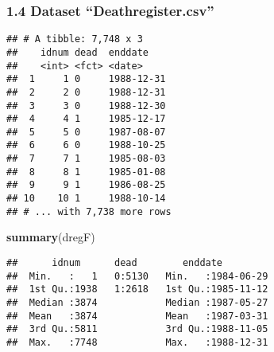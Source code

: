 \documentclass[]{article}
\newenvironment{Shaded}{\begin{snugshade}}{\end{snugshade}}
\newcommand{\DataTypeTok}[1]{\textcolor[rgb]{0.13,0.29,0.53}{#1}}
\newcommand{\KeywordTok}[1]{\textcolor[rgb]{0.13,0.29,0.53}{\textbf{#1}}}
\newcommand{\NormalTok}[1]{#1}
\newcommand{\OperatorTok}[1]{\textcolor[rgb]{0.81,0.36,0.00}{\textbf{#1}}}
\newcommand{\StringTok}[1]{\textcolor[rgb]{0.31,0.60,0.02}{#1}}
\begin{document}
\hypertarget{dataset-deathregister.csv}{%
\subsubsection{1.4 Dataset
``Deathregister.csv''}\label{dataset-deathregister.csv}}

\begin{Shaded}
\end{Shaded}

\begin{verbatim}
## # A tibble: 7,748 x 3
##    idnum dead  enddate   
##    <int> <fct> <date>    
##  1     1 0     1988-12-31
##  2     2 0     1988-12-31
##  3     3 0     1988-12-30
##  4     4 1     1985-12-17
##  5     5 0     1987-08-07
##  6     6 0     1988-10-25
##  7     7 1     1985-08-03
##  8     8 1     1985-01-08
##  9     9 1     1986-08-25
## 10    10 1     1988-10-14
## # ... with 7,738 more rows
\end{verbatim}

\begin{Shaded}
\begin{Highlighting}[]
\KeywordTok{summary}\NormalTok{(dregF)}
\end{Highlighting}
\end{Shaded}

\begin{verbatim}
##      idnum      dead        enddate          
##  Min.   :   1   0:5130   Min.   :1984-06-29  
##  1st Qu.:1938   1:2618   1st Qu.:1985-11-12  
##  Median :3874            Median :1987-05-27  
##  Mean   :3874            Mean   :1987-03-31  
##  3rd Qu.:5811            3rd Qu.:1988-11-05  
##  Max.   :7748            Max.   :1988-12-31
\end{verbatim}

\begin{Shaded}
\end{Shaded}
\end{document}
